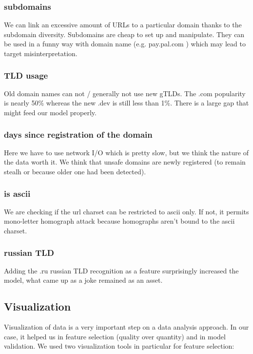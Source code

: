 \documentclass[conference,11pt]{IEEEtran}
\begin{document}
\subsubsection{subdomains}
We can link an excessive amount of URLs to a particular domain thanks to the
subdomain diversity. Subdomains are cheap to set up and manipulate. They can be
used in a funny way with domain name (e.g. pay.pal.com ) which may lead to
target misinterpretation.

\subsubsection{TLD usage}
Old domain names can not / generally not use new gTLDs. The .com popularity is
nearly 50\% whereas the new .dev is still less than 1\%. \cite{tld-stats} There
is a large gap that might feed our model properly.

\subsubsection{days since registration of the domain}
Here we have to use network I/O which is pretty slow, but we think the nature of
the data worth it. We think that unsafe domains are newly registered (to remain
stealh or because older one had been detected).

\subsubsection{is ascii}
We are checking if the url charset can be restricted to ascii only. If not, it
permits mono-letter homograph attack because homographs aren't bound to the
ascii charset.

\subsubsection{russian TLD}
Adding the .ru russian TLD recognition as a feature surprisingly increased the
model, what came up as a joke remained as an asset.

\subsection{Visualization}
Visualization of data is a very important step on a data analysis approach. In
our case, it helped us in feature selection (quality over quantity) and in model
validation. We used two visualization tools in particular for feature selection:
\end{document}

